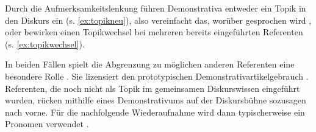 \noindent
Durch die Aufmerksamkeitslenkung führen Demonstrativa entweder ein Topik in den Diskurs ein (s. \ref{ex:topikneu}), also vereinfacht das, worüber gesprochen wird \parencite{Jacobs2001}, oder bewirken einen Topikwechsel bei mehreren bereits eingeführten Referenten (s. \ref{ex:topikwechsel}). 

\begin{exe}
	\ex 
	\begin{xlist} \label{ex:proto-dem}
		\ex \label{ex:topikneu} 
		\ex \label{ex:topikwechsel}   
		\end{xlist}
\end{exe}

\noindent
In beiden Fällen spielt die Abgrenzung zu möglichen anderen Referenten eine besondere Rolle \parencite[80]{Bisle-Muller1991}. Sie lizensiert den prototypischen Demonstrativartikelgebrauch \parencite[s. auch][]{Schlachter2015}. Referenten, die noch nicht als Topik im gemeinsamen Diskurswissen eingeführt wurden, rücken mithilfe eines Demonstrativums auf der Diskursbühne sozusagen nach vorne. Für die nachfolgende Wiederaufnahme wird dann typischerweise ein Pronomen verwendet \parencite[297]{Gundel1993}. 

